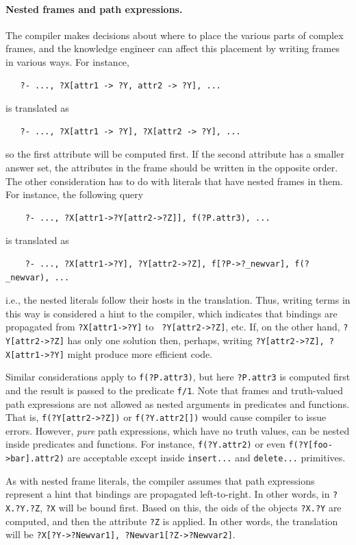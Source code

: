 \documentclass[11pt]{article}
\newcommand{\ERGO}{\mbox{\smaller{\ensuremath{\cal{E}}\smaller{{\sc{RGO}}}}}\xspace}
\newcommand{\FLSYSTEM}{\ERGO}
\begin{document}
\paragraph{Nested frames and path expressions.}
The \FLSYSTEM compiler makes decisions about
where to place the various parts of complex frames, and the
knowledge engineer can affect this placement by writing frames in various ways.
For instance,
\begin{verbatim}
   ?- ..., ?X[attr1 -> ?Y, attr2 -> ?Y], ...
\end{verbatim}
is translated as
\begin{verbatim}
   ?- ..., ?X[attr1 -> ?Y], ?X[attr2 -> ?Y], ...  
\end{verbatim}
so the first attribute will be computed first. If the second attribute has
a smaller answer set, the attributes in the frame should be written in
the opposite order. The other consideration has to do with literals that
have nested frames in them. For instance, the following query
\begin{verbatim}
    ?- ..., ?X[attr1->?Y[attr2->?Z]], f(?P.attr3), ...
\end{verbatim}
is translated as
\begin{verbatim}
    ?- ..., ?X[attr1->?Y], ?Y[attr2->?Z], f[?P->?_newvar], f(?_newvar), ...
\end{verbatim}
i.e., the nested literals follow their hosts in the translation.
Thus, writing terms in this way is considered a hint to the compiler, which
indicates that bindings are propagated from {\tt ?X[attr1->?Y]} to {\tt
  ?Y[attr2->?Z]}, etc. If, on the other hand, {\tt ?Y[attr2->?Z]} has only one
solution then, perhaps, writing {\tt ?Y[attr2->?Z], ?X[attr1->?Y]} might
produce more efficient code.

Similar considerations apply to {\tt f(?P.attr3)}, but here
\texttt{?P.attr3} is computed first and the result is passed to the
predicate \texttt{f/1}.   
Note that frames and
truth-valued path expressions are not allowed as nested arguments
in predicates and functions. That is, \texttt{f(?Y[attr2->?Z])} or
\texttt{f(?Y.attr2[])} would cause compiler to issue errors. However,
\emph{pure} path expressions, which have no truth values, can be nested
inside predicates and functions. For instance, \texttt{f(?Y.attr2)} or 
even \texttt{f(?Y[foo->bar].attr2)} are acceptable except inside
\texttt{insert{...}}  and \texttt{delete{...}} primitives. 

As with nested frame literals, the \FLSYSTEM compiler assumes that path
expressions represent a hint that bindings are propagated left-to-right.
In other words, in {\tt ?X.?Y.?Z}, {\tt ?X} will be bound first.
Based on this, the oids of the objects {\tt ?X.?Y} are computed, and
then the attribute {\tt ?Z} is applied. In other words, the translation will
be {\tt ?X[?Y->?Newvar1], ?Newvar1[?Z->?Newvar2]}.
\end{document}
